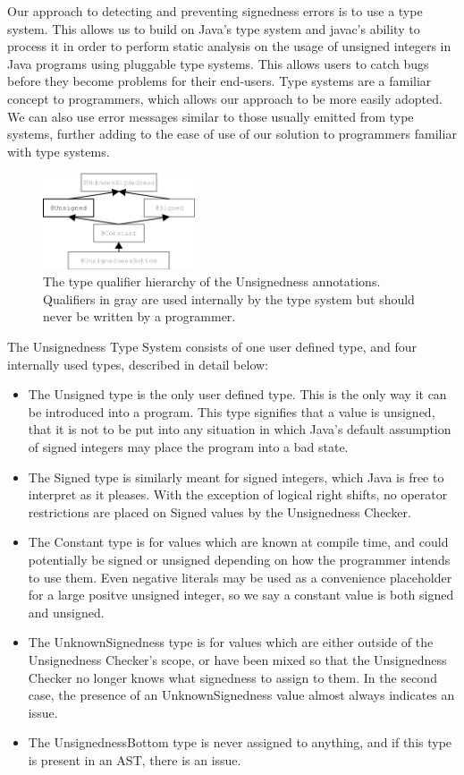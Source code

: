 \documentclass{sig-alternate-05-2015}
\begin{document}
Our approach to detecting and preventing signedness errors is to use a type system. This allows us to build on Java's type system and javac's ability to process it in order to perform static analysis on the usage of unsigned integers in Java programs using pluggable type systems. This allows users to catch bugs before they become problems for their end-users. Type systems are a familiar concept to programmers, which allows our approach to be more easily adopted. We can also use error messages similar to those usually emitted from type systems, further adding to the ease of use of our solution to programmers familiar with type systems.

\begin{figure}
    \centering
    \includegraphics[width=0.4\textwidth]{unsignedness}
    \caption{The type qualifier hierarchy of the Unsignedness annotations.
Qualifiers in gray are used internally by the type system but should never be written by a programmer.}
    \label{fig:my_label}
\end{figure}

The Unsignedness Type System consists of one user defined type, and four internally used types, described in detail below:

\begin{itemize}
  \item The Unsigned type is the only user defined type. This is the only way it can be introduced into a program. This type signifies that a value is unsigned, that it is not to be put into any situation in which Java's default assumption of signed integers may place the program into a bad state.
  \item The Signed type is similarly meant for signed integers, which Java is free to interpret as it pleases. With the exception of logical right shifts, no operator restrictions are placed on Signed values by the Unsignedness Checker.
  \item The Constant type is for values which are known at compile time, and could potentially be signed or unsigned depending on how the programmer intends to use them. Even negative literals may be used as a convenience placeholder for a large positve unsigned integer, so we say a constant value is both signed and unsigned.
  \item The UnknownSignedness type is for values which are either outside of the Unsignedness Checker's scope, or have been mixed so that the Unsignedness Checker no longer knows what signedness to assign to them. In the second case, the presence of an UnknownSignedness value almost always indicates an issue.
  \item The UnsignednessBottom type is never assigned to anything, and if this type is present in an AST, there is an issue.
\end{itemize}
\end{document}
